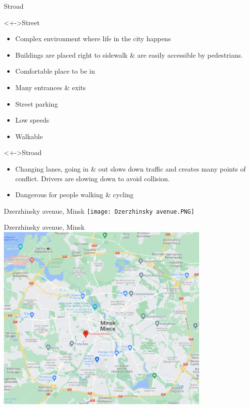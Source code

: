 \documentclass{beamer}
\begin{document}
    \begin{frame}{Stroad}
        \begin{block}
            <+->{Street}
            \begin{itemize}
                \item Complex environment where life in the city happens
                \item Buildings are placed right to sidewalk \& are easily accessible by pedestrians.
                \item Comfortable place to be in
                \item Many entrances \& exits
                \item Street parking
                \item Low speeds
                \item Walkable
            \end{itemize}
        \end{block}
        \begin{block}
            <+->{Stroad}
            \begin{itemize}
                \item Changing lanes, going in \& out slows down traffic and creates many points of conflict. Drivers are slowing down to avoid collision.
                \item Dangerous for people walking \& cycling
            \end{itemize}
        \end{block}
    \end{frame}

    \begin{frame}{Dzerzhinsky avenue, Minsk}
        \texttt{[image: Dzerzhinsky avenue.PNG]}
    \end{frame}

    \begin{frame}{Dzerzhinsky avenue, Minsk}
        \includegraphics[width = 0.8\textwidth]{Dzerzhinsky avenue map.PNG}
    \end{frame}
\end{document}
